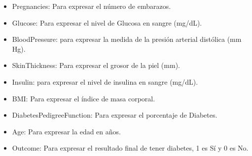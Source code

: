 \documentclass[
  11pt,
]{book}
\providecommand{\tightlist}{%
  \setlength{\itemsep}{0pt}\setlength{\parskip}{0pt}}
\theoremstyle{definition}
\theoremstyle{definition}
\theoremstyle{definition}
\theoremstyle{definition}
\theoremstyle{remark}
\begin{document}
\begin{itemize}
  \begin{itemize}
  \tightlist
  \item
    Pregnancies: Para expresar el número de embarazos.
  \item
    Glucose: Para expresar el nivel de Glucosa en sangre (mg/dL).
  \item
    BloodPressure: para expresar la medida de la presión arterial distólica (mm Hg).
  \item
    SkinThickness: Para expresar el grosor de la piel (mm).
  \item
    Insulin: para expresar el nivel de insulina en sangre (mg/dL).
  \item
    BMI: Para expresar el índice de masa corporal.
  \item
    DiabetesPedigreeFunction: Para expresar el porcentaje de Diabetes.
  \item
    Age: Para expresar la edad en años.
  \item
    Outcome: Para expresar el resultado final de tener diabetes, 1 es Sí y 0 es No.
  \end{itemize}
\end{itemize}

\backmatter


\end{document}
